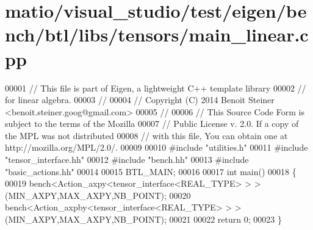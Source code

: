 \hypertarget{matio_2visual__studio_2test_2eigen_2bench_2btl_2libs_2tensors_2main__linear_8cpp_source}{}\section{matio/visual\+\_\+studio/test/eigen/bench/btl/libs/tensors/main\+\_\+linear.cpp}
\label{matio_2visual__studio_2test_2eigen_2bench_2btl_2libs_2tensors_2main__linear_8cpp_source}

\begin{DoxyCode}
00001 \textcolor{comment}{// This file is part of Eigen, a lightweight C++ template library}
00002 \textcolor{comment}{// for linear algebra.}
00003 \textcolor{comment}{//}
00004 \textcolor{comment}{// Copyright (C) 2014 Benoit Steiner <benoit.steiner.goog@gmail.com>}
00005 \textcolor{comment}{//}
00006 \textcolor{comment}{// This Source Code Form is subject to the terms of the Mozilla}
00007 \textcolor{comment}{// Public License v. 2.0. If a copy of the MPL was not distributed}
00008 \textcolor{comment}{// with this file, You can obtain one at http://mozilla.org/MPL/2.0/.}
00009 
00010 \textcolor{preprocessor}{#include "utilities.h"}
00011 \textcolor{preprocessor}{#include "tensor\_interface.hh"}
00012 \textcolor{preprocessor}{#include "bench.hh"}
00013 \textcolor{preprocessor}{#include "basic\_actions.hh"}
00014 
00015 BTL\_MAIN;
00016 
00017 \textcolor{keywordtype}{int} main()
00018 \{
00019   bench<Action\_axpy<tensor\_interface<REAL\_TYPE> > >(MIN\_AXPY,MAX\_AXPY,NB\_POINT);
00020   bench<Action\_axpby<tensor\_interface<REAL\_TYPE> > >(MIN\_AXPY,MAX\_AXPY,NB\_POINT);
00021 
00022   \textcolor{keywordflow}{return} 0;
00023 \}
\end{DoxyCode}
